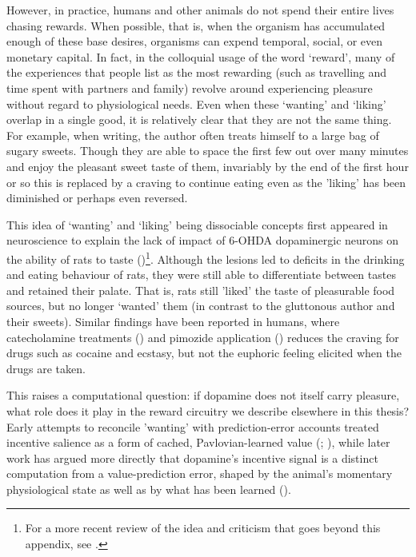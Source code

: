 However, in practice, humans and other animals do not spend their entire lives chasing rewards. When possible, that is, when the organism has accumulated enough of these base desires, organisms can expend temporal, social, or even monetary capital. In fact, in the colloquial usage of the word ‘reward’, many of the experiences that people list as the most rewarding (such as travelling and time spent with partners and family) revolve around experiencing pleasure without regard to physiological needs. Even when these ‘wanting’ and ‘liking’ overlap in a single good, it is relatively clear that they are not the same thing. For example, when writing, the author often treats himself to a large bag of sugary sweets. Though they are able to space the first few out over many minutes and enjoy the pleasant sweet taste of them, invariably by the end of the first hour or so this is replaced by a craving to continue eating even as the 'liking' has been diminished or perhaps even reversed.

This idea of ‘wanting’ and ‘liking’ being dissociable concepts first appeared in neuroscience to explain the lack of impact of 6-OHDA dopaminergic neurons on the ability of rats to taste (\cite{berridgeTasteReactivityAnalysis1989})\footnote{For a more recent review of the idea and criticism that goes beyond this appendix, see \cite{berridge2013neuroeconomics}.}. Although the lesions led to deficits in the drinking and eating behaviour of rats, they were still able to differentiate between tastes and retained their palate. That is, rats still 'liked' the taste of pleasurable food sources, but no longer ‘wanted’ them (in contrast to the gluttonous author and their sweets). Similar findings have been reported in humans, where catecholamine treatments (\cite{leytonCocaineCravingEuphoria2005}) and pimozide application (\cite{brauerHighDosePimozide1997}) reduces the craving for drugs such as cocaine and ecstasy, but not the euphoric feeling elicited when the drugs are taken.

This raises a computational question: if dopamine does not itself carry pleasure, what role does it play in the reward circuitry we describe elsewhere in this thesis? Early attempts to reconcile 'wanting' with prediction-error accounts treated incentive salience as a form of cached, Pavlovian-learned value (\cite{mcclureComputationalSubstrateIncentive2003}; \cite{zhangNeuralComputationalModel2009}), while later work has argued more directly that dopamine's incentive signal is a distinct computation from a value-prediction error, shaped by the animal's momentary physiological state as well as by what has been learned (\cite{berridgePredictionErrorIncentive2012}).

